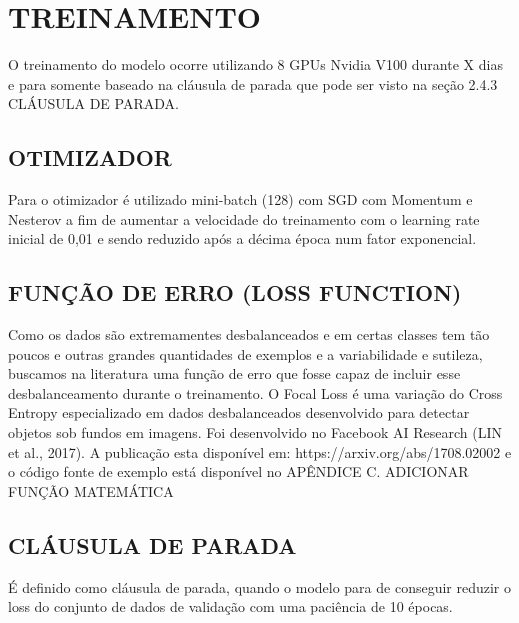 \section{TREINAMENTO}

O treinamento do modelo ocorre utilizando 8 GPUs Nvidia V100 durante X dias e para somente baseado na cláusula de parada que pode ser visto na seção 2.4.3 CLÁUSULA DE PARADA. 

\subsection{OTIMIZADOR}

Para o otimizador é utilizado mini-batch (128) com SGD com Momentum e Nesterov a fim de aumentar a velocidade do treinamento com o learning rate inicial de 0,01 e sendo reduzido após a décima época num fator exponencial.

\subsection{FUNÇÃO DE ERRO (LOSS FUNCTION)}

Como os dados são extremamentes desbalanceados e em certas classes tem tão poucos e outras grandes quantidades de exemplos e a variabilidade e sutileza, buscamos na literatura uma função de erro que fosse capaz de incluir esse desbalanceamento durante o treinamento.
O Focal Loss é uma variação do Cross Entropy especializado em dados desbalanceados desenvolvido para detectar objetos sob fundos em imagens. Foi desenvolvido no Facebook AI Research (LIN et al., 2017). A publicação esta disponível em: https://arxiv.org/abs/1708.02002 e o código fonte de exemplo está disponível no APÊNDICE C.
ADICIONAR FUNÇÃO MATEMÁTICA

\subsection{CLÁUSULA DE PARADA}

É definido como cláusula de parada, quando o modelo para de conseguir reduzir o loss do conjunto de dados de validação com uma paciência de 10 épocas.
